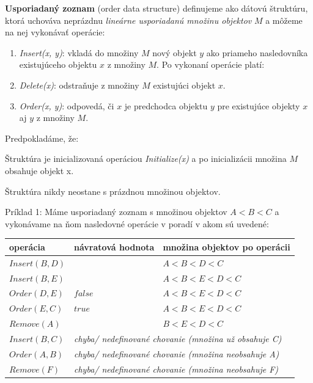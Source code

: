 \documentclass[
  digital,     %
  oneside,     %
  nosansbold,  %
  nocolorbold, %
  lof,         %
  lot,         %
]{fithesis4}
\begin{document}
\textbf{Usporiadaný zoznam} (order data structure) definujeme ako dátovú štruktúru, ktorá uchováva neprázdnu \textit{lineárne usporiadanú množinu objektov} $M$ a môžeme na nej vykonávať operácie:
\begin{enumerate}
    \item \textit{Insert(x, y)}: vkladá do množiny $M$ nový objekt $y$ ako priameho nasledovníka existujúceho objektu $x$ z množiny $M$. Po vykonaní operácie platí:

    \item \textit{Delete(x)}: odstraňuje z množiny $M$ existujúci objekt $x$.
    \item \textit{Order(x, y)}: odpovedá, či $x$ je predchodca objektu $y$ pre existujúce objekty $x$ aj $y$ z množiny $M$.
\end{enumerate}
Predpokladáme, že:
\begin{compactitem}
    \item Štruktúra je inicializovaná operáciou \textit{Initialize(x)} a po inicializácii množina $M$ obsahuje objekt x.
    \item Štruktúra nikdy neostane s prázdnou množinou objektov.\\
\end{compactitem}

Príklad 1:
Máme usporiadaný zoznam s množinou objektov $A < B < C$ a vykonávame na ňom nasledovné operácie v poradí v akom sú uvedené:\\
\begin{table}
\begin{tabularx}{\textwidth}{| l | l | l |}
    operácia & návratová hodnota & množina objektov po operácii \\
    \midrule
    $Insert(B, D)$ &  & $A < B < D < C$\\
    $Insert(B, E)$ &  & $A < B < E < D < C$\\
    $Order(D, E)$ & $false$ & $A < B < E < D < C$\\
    $Order(E, C)$ & $true$ & $A < B < E < D < C$\\
    $Remove(A)$ &  & $B < E < D < C$\\
    $Insert(B, C)$ & \multicolumn{2}{l|}{\textit{chyba/ nedefinované chovanie (množina už obsahuje C)}}\\
    $Order(A, B)$ & \multicolumn{2}{l|}{\textit{chyba/ nedefinované chovanie (množina neobsahuje A)}}\\
    $Remove(F)$ & \multicolumn{2}{l|}{\textit{chyba/ nedefinované chovanie (množina neobsahuje F)}}\\
  \end{tabularx}
\end{table}
\end{document}
